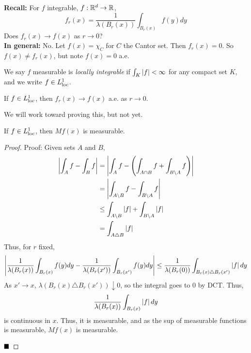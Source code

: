 
\textbf{Recall:} For $f$ integrable, $f : \R^d \to \R$,
\[ f_r(x) = \frac{1}{\lambda(B_r(x))} \int_{B_r(x)} f(y) dy \]
Does $f_r(x) \to f(x)$ as $r \to 0$?\\

\textbf{In general:} No. Let $f(x) = \chi_{C}$ for $C$ the Cantor set. Then $f_r(x) = 0$. So $f(x) \neq f_r(x)$, but note $f(x) = 0$ a.e.

\begin{definition}
    We say $f$ measurable is \emph{locally integrable} if $\int_{K} \abs{f} < \infty$ for any compact set $K$, and we write $f \in L^1_{\tt{loc}}$.
\end{definition}

\begin{lemma}
    If $f \in L^1_{\tt{loc}}$, then $f_r(x) \to f(x)$ a.e. as $r \to 0$.
\end{lemma}

We will work toward proving this, but not yet.

\begin{lemma}
    If $f \in L^1_{\tt{loc}}$, then $Mf(x)$ is measurable.
\end{lemma}
\begin{proof}{Proof:}
    Given sets $A$ and $B$,
    \begin{align*}
        \abs{\int_{A} f - \int_{B} f} &= \abs{\int_{A} f - \left(\int_{A \cap B} f + \int_{B \setminus A} f\right)}\\
        &= \abs{\int_{A \setminus B} f - \int_{B \setminus A} f}\\
        &\leq \int_{A \setminus B} \abs{f} + \int_{B \setminus A} \abs{f}\\
        &= \int_{A \triangle B} \abs{f}
    \end{align*}
    Thus, for $r$ fixed,
    \[ \abs{\frac{1}{\lambda(B_r(x))} \int_{B_r(x)} f(y) dy - \frac{1}{\lambda(B_r(x'))} \int_{B_r(x')} f(y) dy} \leq \frac{1}{\lambda(B_r(0))} \int_{B_r(x) \triangle B_r(x')} \abs{f} dy \]
    As $x' \to x$, $\lambda(B_r(x) \triangle B_r(x')) \downarrow 0$, so the integral goes to $0$ by DCT. Thus,
    \[ \frac{1}{\lambda(B_r(x))} \int_{B_r(x)} \abs{f} dy \]
    is continuous in $x$. Thus, it is measurable, and as the sup of measurable functions is measurable, $Mf(x)$ is measurable.

    $\qed$
\end{proof}

